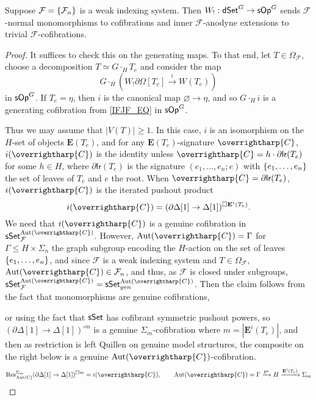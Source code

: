 \documentclass[a4paper,10pt
,draft
]{article}%
\renewcommand{\F}{\mathcal F}
\renewcommand{\1}{\eta}%
\newcommand{\vect}[1]{\text{\overrightharp{\ensuremath{#1}}}}
\begin{document}
\begin{proposition}
      \label{W!_COF_PROP}
      Suppose $\F = \set{\F_n}$ is a weak indexing system.
      Then $W_!: \mathsf{dSet}^G \to \mathsf{sOp}^G$ sends $\F$-normal monomorphisms to cofibrations and inner $\F$-anodyne extensions to trivial $\F$-cofibrations.
\end{proposition}
\begin{proof}
      It suffices to check this on the generating maps.
      To that end, let $T \in \Omega_\F$, choose a decomposition $T \simeq G \cdot_H T_e$ and consider the map
      \begin{equation}
            G \cdot_H \left( W_! \partial \Omega[T_e] \xrightarrow{\ i \ } W(T_e) \right)      
      \end{equation}
      in $\mathsf{sOp}^G$.
      If $T_e = \eta$, then $i$ is the canonical map $\varnothing \to \eta$,
      and so $G \cdot_H i$ is a generating cofibration from \eqref{IFJF_EQ} in $\mathsf{sOp}^G$.

      Thus we may assume that $|V(T)| \geq 1$.
      In this case, $i$ is an isomorphism on the $H$-set of objects $\mathbf E(T_e)$,
      and for any $\mathbf E(T_e)$-signature $\vect C$,
      $i(\vect C)$ is the identity unless $\vect C = h \cdot \partial \mathsf{lr}(T_e)$ for some $h \in H$,
      where $\partial \mathsf{lr}(T_e)$ is the signature $(e_1, \dots, e_n; e)$ 
      with $\left\{e_1,\dots, e_n\right\}$ the set of leaves of $T_e$ and $e$ the root.
      When $\vect C = \partial \mathsf{lr}(T_e)$, $i(\vect C)$ is the iterated pushout product
      \[
            i(\vect C) = (\partial \Delta[1] \to \Delta[1])^{\square \mathbf E^i(T_e)}.
      \]
      We need that $i(\vect C)$ is a genuine cofibration in $\sSet^{\Aut(\vect C)}_\F$.
      However, $\Aut(\vect C) = \Gamma$ for $\Gamma \leq H \times \Sigma_n$ the graph subgroup encoding the $H$-action on the set of leaves $\left\{e_1, \dots, e_n\right\}$,
      and since $\F$ is a weak indexing system and $T \in \Omega_\F$,
      $\Aut(\vect C) \in \F_n$,
      and thus, as $\F$ is closed under subgroups, $\sSet^{\Aut(\vect C)}_\F = \sSet^{\Aut(\vect C)}_{gen}$.
      Then the claim follows from the fact that monomorphisms are genuine cofibrations,
      {\color{OliveGreen} %
        or using the fact that $\mathsf{sSet}$ has cofibrant symmetric pushout powers,
        so $(\partial \Delta[1] \to \Delta[1])^{\square m}$ is a genuine $\Sigma_m$-cofibration where $m = |\mathbf E^i(T_e)|$,
        and then as restriction is left Quillen on genuine model structures,
        the composite on the right below is a genuine $\Aut(\vect C)$-cofibration.
        \[
              \mathrm{Res}^{\Sigma_m}_{\Aut(C)}(\partial \Delta[1] \to \Delta[1])^{\square m} = i(\vect C),
              \qquad
              \Aut(\vect C) = \Gamma \xrightarrow{pr} H \xrightarrow{\mathbf E^i(T_e)} \Sigma_m
        \]

}
\end{proof}
\end{document}
